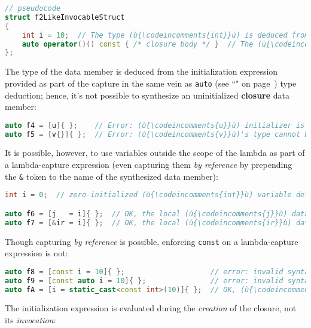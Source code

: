 \begin{lstlisting}[language=C++]
// pseudocode
struct f2LikeInvocableStruct
{
    int i = 10;  // The type (ù{\codeincomments{int}}ù) is deduced from the initialization expression.
    auto operator()() const { /* closure body */ }  // The (ù{\codeincomments{struct}}ù) is invocable.
};
\end{lstlisting}

\noindent The type of the data member is deduced from the initialization
expression provided as part of the capture in the same vein as
\texttt{auto} (see ``" on page~\pageref{auto-feature}) type deduction; hence, it's not possible to
synthesize an uninitialized \textbf{closure} data member:

\begin{lstlisting}[language=C++]
auto f4 = [u]{ };    // Error: (ù{\codeincomments{u}}ù) initializer is missing for lambda capture.
auto f5 = [v{}]{ };  // Error: (ù{\codeincomments{v}}ù)'s type cannot be deduced.
\end{lstlisting}

\noindent It is possible, however, to use variables outside the scope of the
lambda as part of a lambda-capture expression (even capturing them \textit{by
reference} by prepending the \texttt{\&} token to the name of the
synthesized data member):

\begin{lstlisting}[language=C++]
int i = 0;  // zero-initialized (ù{\codeincomments{int}}ù) variable defined in the enclosing scope

auto f6 = [j   = i]{ };  // OK, the local (ù{\codeincomments{j}}ù) data member is a copy of (ù{\codeincomments{i}}ù).
auto f7 = [&ir = i]{ };  // OK, the local (ù{\codeincomments{ir}}ù) data member is an alias to (ù{\codeincomments{i}}ù).
\end{lstlisting}

\noindent Though capturing \textit{by reference} is possible, enforcing \texttt{const} on a lambda-capture expression is not:

\begin{lstlisting}[language=C++]
auto f8 = [const i = 10]{ };                    // error: invalid syntax
auto f9 = [const auto i = 10]{ };               // error: invalid syntax
auto fA = [i = static_cast<const int>(10)]{ };  // OK, (ù{\codeincomments{const}}ù) is ignored.
\end{lstlisting}

\noindent The initialization expression is evaluated during the \emph{creation} of
the closure, not its \emph{invocation}:

